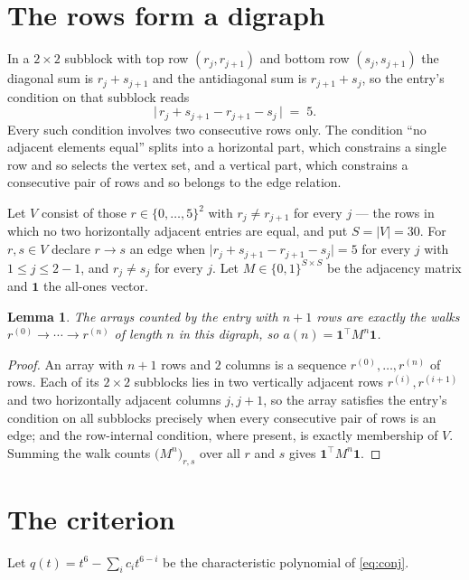 \documentclass[11pt,a4paper]{article}
\theoremstyle{plain}
\newtheorem{lemma}[theorem]{Lemma}
\theoremstyle{definition}
\begin{document}
\section{The rows form a digraph}

In a $2\times2$ subblock with top row $(r_j,r_{j+1})$ and bottom row $(s_j,s_{j+1})$ the
diagonal sum is $r_j+s_{j+1}$ and the antidiagonal sum is $r_{j+1}+s_j$, so the entry's
condition on that subblock reads
\[
\bigl|\,r_j+s_{j+1}-r_{j+1}-s_j\,\bigr|\;=\;5.
\]
Every such condition involves two consecutive rows only. The condition ``no adjacent elements equal'' splits into a horizontal
part, which constrains a single row and so selects the vertex set, and a vertical part,
which constrains a consecutive pair of rows and so belongs to the edge relation.

Let $V$ consist of those $r\in\{0,\dots,5\}^{2}$ with $r_j\ne r_{j+1}$ for every
$j$ --- the rows in which no two horizontally adjacent entries are equal, and put $S=|V|=30$. For $r,s\in V$ declare $r\to s$ an edge
when $\bigl|r_j+s_{j+1}-r_{j+1}-s_j\bigr|=5$ for every $j$ with
$1\le j\le2-1$, and $r_j\ne s_j$ for every $j$. Let $M\in\{0,1\}^{S\times S}$ be the adjacency matrix and $\mathbf{1}$
the all-ones vector.

\begin{lemma}\label{lem:walk}
The arrays counted by the entry with $n+1$ rows are exactly the walks
$r^{(0)}\to\cdots\to r^{(n)}$ of length $n$ in this digraph, so
$a(n)=\mathbf{1}^{\!\top}M^{n}\mathbf{1}$.
\end{lemma}

\begin{proof}
An array with $n+1$ rows and $2$ columns is a sequence $r^{(0)},\dots,r^{(n)}$ of
rows. Each of its $2\times2$ subblocks lies in two vertically adjacent rows
$r^{(i)},r^{(i+1)}$ and two horizontally adjacent columns $j,j+1$, so the array satisfies
the entry's condition on all subblocks precisely when every consecutive pair of rows is an
edge; and the row-internal condition, where present, is exactly membership of $V$. Summing
the walk counts $\bigl(M^{n}\bigr)_{r,s}$ over all $r$ and $s$ gives
$\mathbf{1}^{\!\top}M^{n}\mathbf{1}$.
\end{proof}

\section{The criterion}

Let $q(t)=t^{6}-\sum_i c_i t^{6-i}$ be the characteristic polynomial of
\eqref{eq:conj}.
\end{document}
